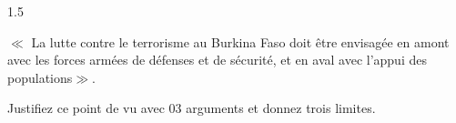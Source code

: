 \documentclass[12pt]{article}
\begin{document}
\begin{spacing}{1.5}

$\ll$ La lutte contre le terrorisme  au Burkina Faso doit être envisagée en amont avec les forces armées de défenses et de sécurité, et en aval avec l'appui des populations$\gg$.

Justifiez ce point de vu avec 03 arguments et donnez trois limites.

\quad

\end{spacing}
\end{document}
